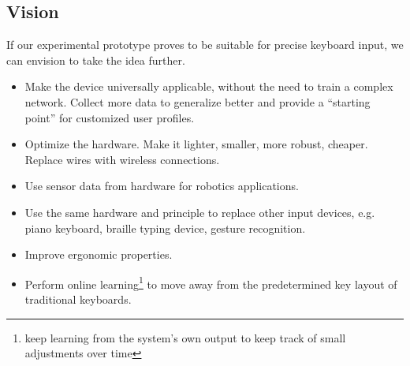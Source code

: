 \subsection{Vision}

If our experimental prototype proves to be suitable for precise keyboard input,
we can envision to take the idea further.

\begin{itemize}
    \item Make the device universally applicable, without the need to
    train a complex network. Collect more data to generalize better and provide
    a ``starting point'' for customized user profiles.
    \item Optimize the hardware. Make it lighter, smaller, more robust,
    cheaper.  Replace wires with wireless connections. 
    \item Use sensor data from hardware for robotics applications.
    \item Use the same hardware and principle to replace other input
    devices, e.g. piano keyboard, braille typing device, gesture recognition.
    \item Improve ergonomic properties.
    \item Perform online learning\footnote{keep learning from the system's own
    output to keep track of small adjustments over time} to move away from the
    predetermined key layout of traditional keyboards.  
\end{itemize}
